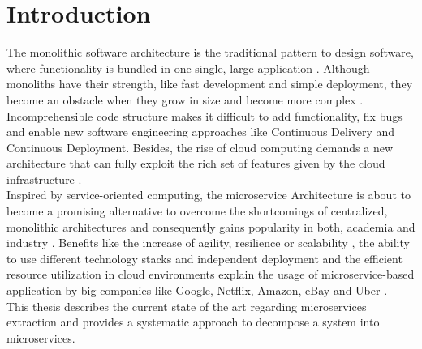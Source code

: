 
\chapter{Introduction}
\label{ch:Introduction}
The monolithic software architecture is the traditional pattern to design software, where functionality is bundled in one single, large application \cite{DataflowDrivenChen}. Although monoliths have their strength, like fast development and simple deployment, they become an obstacle when they grow in size and become more complex \cite{infoq}. Incomprehensible code structure makes it difficult to add functionality, fix bugs and enable new software engineering approaches like Continuous Delivery and Continuous Deployment\cite{cd}. 
Besides, the rise of cloud computing demands a new architecture that can fully exploit the rich set of features given by the cloud infrastructure \cite{MigratingCloud}. \\
Inspired by service-oriented computing, the microservice Architecture is about to become a promising alternative to overcome the shortcomings of centralized, monolithic architectures and consequently gains popularity in both, academia and industry \cite{ObjectAwareAmiri}. Benefits like the increase of agility, resilience or scalability \cite{FunctionalDecompositionHeinrich}, the ability to use different technology stacks and independent deployment \cite{interfaceAnalysisBaresi} and the efficient resource utilization in cloud environments \cite{MigratingCloud} explain the usage of microservice-based application by big companies like Google, Netflix, Amazon, eBay \cite{DataflowDrivenChen} and Uber \cite{FunctionalDecompositionHeinrich}. \\
This thesis describes the current state of the art regarding microservices extraction and provides a systematic approach to decompose a system into microservices.


